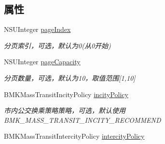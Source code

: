 \subsection*{属性}
\begin{DoxyCompactItemize}
\item 
\hypertarget{interface_b_m_k_mass_transit_route_plan_option_a42fc52431a6abacdbe595c44471a70ff}{}N\+S\+U\+Integer \hyperlink{interface_b_m_k_mass_transit_route_plan_option_a42fc52431a6abacdbe595c44471a70ff}{page\+Index}\label{interface_b_m_k_mass_transit_route_plan_option_a42fc52431a6abacdbe595c44471a70ff}

\begin{DoxyCompactList}\small\item\em 分页索引，可选，默认为0(从0开始) \end{DoxyCompactList}\item 
\hypertarget{interface_b_m_k_mass_transit_route_plan_option_af6a4050fc39bcf2a75e4dd0e2666c37e}{}N\+S\+U\+Integer \hyperlink{interface_b_m_k_mass_transit_route_plan_option_af6a4050fc39bcf2a75e4dd0e2666c37e}{page\+Capacity}\label{interface_b_m_k_mass_transit_route_plan_option_af6a4050fc39bcf2a75e4dd0e2666c37e}

\begin{DoxyCompactList}\small\item\em 分页数量，可选，默认为10，取值范围\mbox{[}1,10\mbox{]} \end{DoxyCompactList}\item 
\hypertarget{interface_b_m_k_mass_transit_route_plan_option_ad452025f756f489075807ab5fcbfadba}{}B\+M\+K\+Mass\+Transit\+Incity\+Policy \hyperlink{interface_b_m_k_mass_transit_route_plan_option_ad452025f756f489075807ab5fcbfadba}{incity\+Policy}\label{interface_b_m_k_mass_transit_route_plan_option_ad452025f756f489075807ab5fcbfadba}

\begin{DoxyCompactList}\small\item\em 市内公交换乘策略策略，可选，默认使用\+B\+M\+K\+\_\+\+M\+A\+S\+S\+\_\+\+T\+R\+A\+N\+S\+I\+T\+\_\+\+I\+N\+C\+I\+T\+Y\+\_\+\+R\+E\+C\+O\+M\+M\+E\+N\+D \end{DoxyCompactList}\item 
\hypertarget{interface_b_m_k_mass_transit_route_plan_option_a4ac3cc5300e0c422d5a70fd4287fe64b}{}B\+M\+K\+Mass\+Transit\+Intercity\+Policy \hyperlink{interface_b_m_k_mass_transit_route_plan_option_a4ac3cc5300e0c422d5a70fd4287fe64b}{intercity\+Policy}\label{interface_b_m_k_mass_transit_route_plan_option_a4ac3cc5300e0c422d5a70fd4287fe64b}


\end{DoxyCompactItemize}

